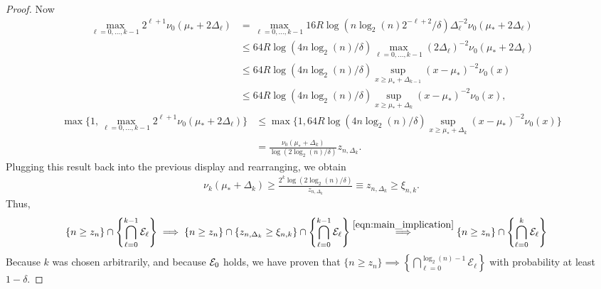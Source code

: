 \begin{proof}
Now
\begin{align*}
\max_{\ell=0,\dots,k-1}  2^{\ell+1} \nu_0(\mu_* + 2\Delta_{\ell}) &= \max_{\ell=0,\dots,k-1}  16 R \log(n \log_2(n) 2^{-\ell+2}/\delta) \Delta_{\ell}^{-2}  \nu_0(\mu_* + 2\Delta_{\ell}) \\
&\leq 64 R \log(4 n \log_2(n) /\delta) \max_{\ell=0,\dots,k-1}  (2\Delta_{\ell})^{-2}  \nu_0(\mu_* + 2\Delta_{\ell}) \\
&\leq 64 R \log(4 n \log_2(n) /\delta) \sup_{x \geq \mu_* + \Delta_{k-1}}  (x-\mu_*)^{-2}  \nu_0(x) \\
&\leq 64 R \log(4 n \log_2(n) /\delta) \sup_{x \geq \mu_* + \Delta_{k}}  (x-\mu_*)^{-2}  \nu_0(x),
\end{align*}
\begin{align*}
\max\{1, \max_{\ell=0,\dots,k-1}  2^{\ell+1} \nu_0(\mu_* + 2\Delta_{\ell}) \}
&\leq \max\{1, 64 R \log(4 n \log_2(n) /\delta) \sup_{x \geq \mu_* + \Delta_{k}}  (x-\mu_*)^{-2}  \nu_0(x)\} \\
&=\tfrac{\nu_0(\mu_* + \Delta_{k})}{\log(2 \log_2(n)/\delta)} z_{n,\Delta_{k}}.
\end{align*}
Plugging this result back into the previous display and rearranging, we obtain
\begin{align*}
\nu_{k}(\mu_*+\Delta_k) \geq \frac{2^k \log(2 \log_2(n)/\delta)}{z_{n,\Delta_{k}}} \equiv z_{n,\Delta_k} \geq \xi_{n,k}.
\end{align*}
Thus,
\begin{align*}
\{n \geq z_n \} \cap \left\{ \bigcap_{\ell=0}^{k-1} \mathcal{E}_\ell \right\} &\implies \{n \geq z_n \} \cap \{z_{n,\Delta_k} \geq \xi_{n,k} \} \cap \left\{ \bigcap_{\ell=0}^{k-1} \mathcal{E}_\ell \right\}  \overset{\eqref{eqn:main_implication}}{\implies} \{n \geq z_n \} \cap  \left\{ \bigcap_{\ell=0}^{k} \mathcal{E}_\ell \right\}
\end{align*}
Because $k$ was chosen arbitrarily, and because $\mathcal{E}_0$ holds, we have proven that 
$\{n \geq z_n \} \implies \left\{ \bigcap_{\ell=0}^{\log_2(n)-1} \mathcal{E}_\ell \right\}$ 
with probability at least $1-\delta$.
\end{proof}


